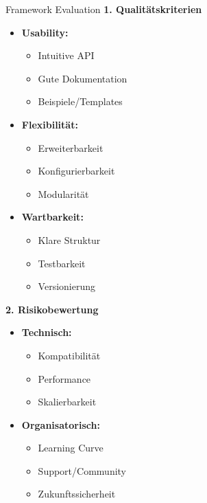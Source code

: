 \begin{KR}{Framework Evaluation}
\textbf{1. Qualitätskriterien}
\begin{itemize}
    \item \textbf{Usability:}
    \begin{itemize}
        \item Intuitive API
        \item Gute Dokumentation
        \item Beispiele/Templates
    \end{itemize}
    
    \item \textbf{Flexibilität:}
    \begin{itemize}
        \item Erweiterbarkeit
        \item Konfigurierbarkeit
        \item Modularität
    \end{itemize}
    
    \item \textbf{Wartbarkeit:}
    \begin{itemize}
        \item Klare Struktur
        \item Testbarkeit
        \item Versionierung
    \end{itemize}
\end{itemize}

\textbf{2. Risikobewertung}
\begin{itemize}
    \item \textbf{Technisch:}
    \begin{itemize}
        \item Kompatibilität
        \item Performance
        \item Skalierbarkeit
    \end{itemize}
    
    \item \textbf{Organisatorisch:}
    \begin{itemize}
        \item Learning Curve
        \item Support/Community
        \item Zukunftssicherheit
    \end{itemize}
\end{itemize}
\end{KR}


